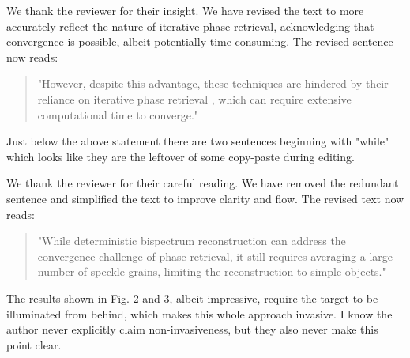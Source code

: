 \documentclass[12pt]{article}
\newcommand{\hlred}[1]{\sethlcolor{red!30}\hl{#1}}
\newenvironment{solved_reviewercomment}
    {\begin{tcolorbox}[width=\linewidth,colback=gray!5,colframe=solved_commentcolor!50,title=Reviewer Comment,left=5pt,right=5pt]}
    {\end{tcolorbox}}
\newenvironment{ourresponse}
    {\begin{tcolorbox}[width=\linewidth,breakable,enhanced,colback=gray!5,colframe=responsecolor!50,title=Response,left=5pt,right=5pt]}
    {\end{tcolorbox}}
\begin{document}
        \begin{ourresponse}
            We thank the reviewer for their insight. We have revised the text to more accurately reflect the nature of iterative phase retrieval, acknowledging that convergence is possible, albeit potentially time-consuming. The revised sentence now reads:  
            \begin{quote}
                "However, despite this advantage, these techniques are hindered by their reliance on iterative phase retrieval \cite{fienup1978reconstruction}, which can require extensive computational time to converge."
            \end{quote}
            
        \end{ourresponse}
        
    \leavevmode\vspace{-\baselineskip}
        \begin{solved_reviewercomment}
            Just below the above statement there are two sentences beginning with "while" which looks like they are the leftover of some copy-paste during editing.
        \end{solved_reviewercomment}
        \begin{ourresponse}
            We thank the reviewer for their careful reading. We have removed the redundant sentence and simplified the text to improve clarity and flow. The revised text now reads:
            \begin{quote}
                "While deterministic bispectrum reconstruction can address the convergence challenge of phase retrieval, it still requires averaging a large number of speckle grains, limiting the reconstruction to simple objects."
            \end{quote}
        \end{ourresponse}
    \leavevmode\vspace{-\baselineskip}
        \begin{solved_reviewercomment}
            The results shown in Fig. 2 and 3, albeit impressive, require the target to be illuminated from behind, which makes this whole approach invasive. I know the author never explicitly claim non-invasiveness, but they also never make this point clear.
        \end{solved_reviewercomment}
\end{document}
